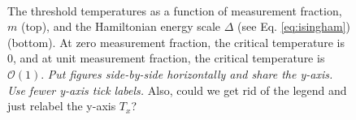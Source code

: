 \documentclass[twocolumn,superscriptaddress,aps,prb,floatfix]{revtex4-1}
\newcommand{\CMH}[1]{{\color{green} { #1}}}
\newcommand{\MS}[1]{{\color{mauve} {#1}}}
\begin{document}
\begin{figure}
\begin{center}
\\
\vspace{-1.2\baselineskip}
\end{center}
\caption[justification=raggedright]{The threshold temperatures as a function of measurement fraction, $m$ (top),  and the Hamiltonian energy scale $\Delta$ (see Eq. \ref{eq:isingham})(bottom).  At zero measurement fraction, the critical temperature is 0, and at unit measurement fraction, the critical temperature is $\mathcal{O}(1)$. \CMH{\it{Put figures side-by-side horizontally and share the y-axis. Use fewer y-axis tick labels.}} \MS{Also, could we get rid of the legend and just relabel the y-axis $T_x$?}}
\label{fig:CriticalTempVsMeasurementFraction}
\end{figure}


\end{document}
